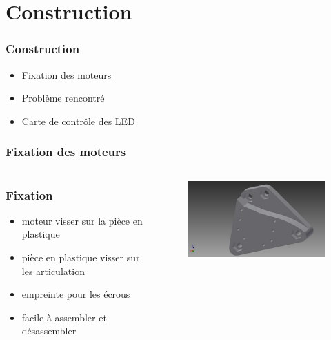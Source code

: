 \section{Construction}

\begin{frame}
 \frametitle{Construction}
  \begin{itemize}
  	\item Fixation des moteurs
  	\item Problème rencontré
  	\item Carte de contrôle des LED
  \end{itemize}
\end{frame}

\begin{frame}
  \frametitle{Fixation des moteurs}
  \begin{columns}[c]
  	\begin{column}[T]{.5\textwidth}
  		\frametitle{Fixation}
  		\begin{itemize}
  		 \item moteur visser sur la pièce en plastique
  		  \item pièce en plastique visser sur les articulation
  		  \item empreinte pour les écrous
  		  \item facile à assembler et désassembler
  		\end{itemize}
  	\end{column}
	\begin{column}[T]{.5\textwidth}  
  		\begin{figure}
  			\includegraphics[scale=1]{../img/part_middle_v1.bmp}
 		 \end{figure}
 	\end{column}
 \end{columns}
\end{frame}

